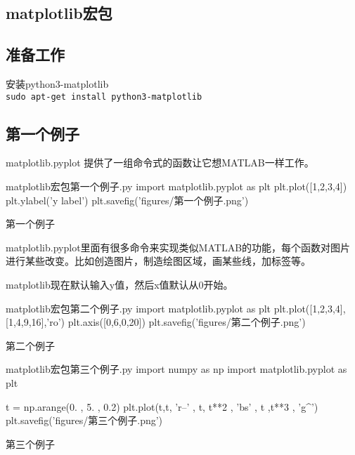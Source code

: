 \documentclass[11pt,oneside]{book}
\begin{document}
\begin{common-format}
\mainmatter


\chapter{matplotlib宏包}
\section{准备工作}
安装python3-matplotlib\\
\verb+sudo apt-get install python3-matplotlib+

\section{第一个例子}
matplotlib.pyplot 提供了一组命令式的函数让它想MATLAB一样工作。
\begin{xverbatim}[129]{matplotlib宏包第一个例子.py}
import matplotlib.pyplot as plt
plt.plot([1,2,3,4])
plt.ylabel('y label')
plt.savefig('figures/第一个例子.png')
\end{xverbatim}

\begin{linefig}{第一个例子}
\end{linefig}

matplotlib.pyplot里面有很多命令来实现类似MATLAB的功能，每个函数对图片进行某些改变。比如创造图片，制造绘图区域，画某些线，加标签等。

matplotlib现在默认输入y值，然后x值默认从0开始。

\begin{xverbatim}[129]{matplotlib宏包第二个例子.py}
import matplotlib.pyplot as plt
plt.plot([1,2,3,4],[1,4,9,16],'ro')
plt.axis([0,6,0,20])
plt.savefig('figures/第二个例子.png')
\end{xverbatim}

\begin{linefig}{第二个例子}
\end{linefig}

\begin{xverbatim}[129]{matplotlib宏包第三个例子.py}
import numpy as np
import matplotlib.pyplot as plt

t = np.arange(0. , 5. , 0.2)
plt.plot(t,t, 'r--' , t, t**2 , 'bs' , t ,t**3 , 'g^')
plt.savefig('figures/第三个例子.png')
\end{xverbatim}

\begin{linefig}{第三个例子}
\end{linefig}



\end{common-format}
\end{document}
